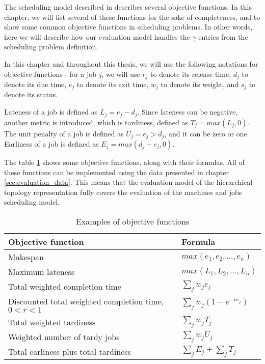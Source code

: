 The scheduling model described in \citep{pinedo2016scheduling} describes several objective functions. In this chapter, we will list several of these functions for the sake of completeness, and to show some common objective functions in scheduling problems. In other words, here we will describe how our evaluation model handles the $ \gamma $ entries from the scheduling problem definition.

In this chapter and throughout this thesis, we will use the following notations for objective functions - for a job $j$, we will use $r_j$ to denote its release time, $d_j$ to denote its due time, $e_j$ to denote its exit time, $w_j$ to denote its weight, and $s_j$ to denote its status.

Lateness of a job is defined as $L_j = e_j - d_j$. Since lateness can be negative, another metric is introduced, which is tardiness, defined as $T_j = max(L_j, 0)$. The unit penalty of a job is defined as $U_j = e_j > d_j$, and it can be zero or one. Earliness of a job is defined as $E_j = max(d_j - e_j, 0)$.

The table \ref{tab:objective_functions_table} shows some objective functions, along with their formulas. All of these functions can be implemented using the data presented in chapter \ref{sec:evaluation_data}. This means that the evaluation model of the hierarchical topology representation fully covers the evaluation of the machines and jobs scheduling model.

\begin{table}[!htbp]
    \begin{center}
        \begin{tabular}{|l|l|} 
         \hline
         Objective function & Formula \\ [0.5ex] 
         \hline\hline
         Makespan & $ max(e_1, e_2, ..., e_n) $ \\ 
         \hline
         Maximum lateness & $  max(L_1, L_2, ..., L_n) $ \\ 
         \hline
         Total weighted completion time & $ \sum_{j} w_j e_j $ \\ 
         \hline
         Discounted total weighted completion time, $ 0 < r < 1$ & $ \sum_{j} w_j (1 - e^{-r e_j}) $ \\ 
         \hline
         Total weighted tardiness & $ \sum_{j} w_j T_j $ \\ 
         \hline
         Weighted number of tardy jobs & $ \sum_{j} w_j U_j $ \\ 
         \hline
         Total earliness plus total tardiness & $ \sum_{j} E_j + \sum_{j} T_j $ \\ 
         \hline
        \end{tabular}
        \end{center}
        \caption{Examples of objective functions}
    \label{tab:objective_functions_table}
    \end{table}

